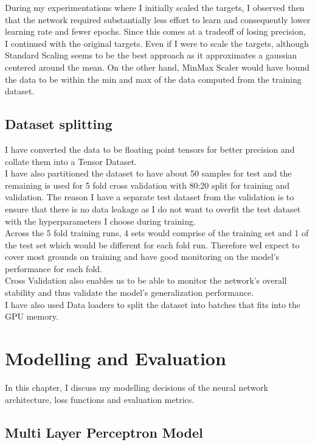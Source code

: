 \documentclass{report} %
\begin{document}
During my experimentations where I initially scaled the targets, I observed then that the network required substantially less effort to learn and consequently lower learning rate and fewer epochs.
Since this comes at a tradeoff of losing precision, I continued with the original targets.
Even if I were to scale the targets, although Standard Scaling seems to be the best approach as it approximates a gaussian centered around the mean.
On the other hand, MinMax Scaler would have bound the data to be within the min and max of the data computed from the training dataset.

\section{Dataset splitting}\label{sec:Dataset splitting}
I have converted the data to be floating point tensors for better precision and collate them into a Tensor Dataset.\\
I have also partitioned the dataset to have about 50 samples for test and the remaining is used for 5 fold cross validation with 80:20 split for training and validation. 
The reason I have a separate test dataset from the validation is to ensure that there is no data leakage as I do not want to 
overfit the test dataset with the hyperparameters I choose during training. \\

Across the 5 fold training runs, 4 sets would comprise of the training set and 1 of the test set which would be different for each fold run.
Therefore weI expect to cover most grounds on training and have good monitoring on the model's performance for each fold.\\
Cross Validation also enables us to be able to monitor the network's overall stability and thus validate the model's generalization performance.\\
I have also used Data loaders to split the dataset into batches that fits into the \ac{GPU} memory.

\chapter{Modelling and Evaluation}
In this chapter, I discuss my modelling decisions of the neural network architecture, loss functions and evaluation metrics.

\section{Multi Layer Perceptron Model}\label{sec:MLP Model}
\end{document}
